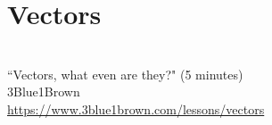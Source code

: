 \section{Vectors}
\begin{bookfigure}
   \\
  ``Vectors, what even are they?" (5 minutes) \\
  \footnotesize 3Blue1Brown \\
  \url{https://www.3blue1brown.com/lessons/vectors}
\end{bookfigure}
